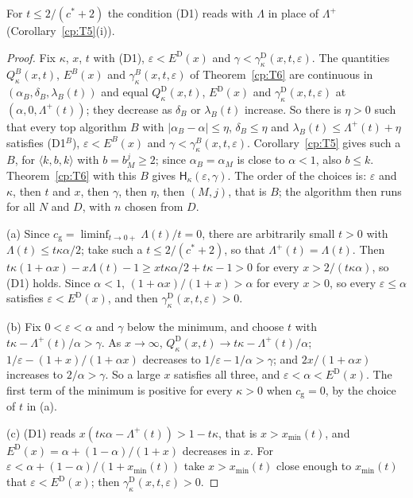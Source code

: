 \documentclass[11pt]{article}
\theoremstyle{definition}
\theoremstyle{remark}
\providecommand{\eps}{\varepsilon}
\newcommand{\abs}[1]{\lvert #1\rvert}
\newcommand{\mat}[3]{\langle #1,#2,#3\rangle} %
\newcommand{\Hypk}[1]{\mathsf{H}_{#1}}        %
\newcommand{\lamB}{\lambda_B}                 %
\newcommand{\delB}{\delta_B}                  %
\newcommand{\alB}{\alpha_B}                   %
\newcommand{\Lam}{\Lambda}                    %
\newcommand{\Lamp}{\Lambda^{+}}               %
\newcommand{\cg}{c_{\mathrm g}}               %
\newcommand{\cstar}{c^{*}}                    %
\newcommand{\Dcond}{\textup{(D1)}}            %
\newcommand{\Qgain}[2]{Q^{#1}_{#2}}           %
\newcommand{\Erange}[1]{E^{#1}}               %
\newcommand{\gbound}[2]{\gamma^{#1}_{#2}}     %
\newcommand{\xmin}{x_{\min}}                  %
\begin{document}
For $t\le2/(\cstar+2)$ the condition \Dcond{} reads with $\Lam$ in place of $\Lamp$ (Corollary~\ref{cp:T5}(i)).

\begin{proof}
Fix $\kappa$, $x$, $t$ with \Dcond, $\eps<\Erange{\mathrm D}(x)$ and $\gamma<\gbound{\mathrm D}\kappa(x,t,\eps)$. The quantities $\Qgain B\kappa(x,t)$, $\Erange B(x)$ and $\gbound B\kappa(x,t,\eps)$ of Theorem~\ref{cp:T6} are continuous in $(\alB,\delB,\lamB(t))$ and equal $\Qgain{\mathrm D}\kappa(x,t)$, $\Erange{\mathrm D}(x)$ and $\gbound{\mathrm D}\kappa(x,t,\eps)$ at $(\alpha,0,\Lamp(t))$; they decrease as $\delB$ or $\lamB(t)$ increase. So there is $\eta>0$ such that every top algorithm $B$ with $\abs{\alB-\alpha}\le\eta$, $\delB\le\eta$ and $\lamB(t)\le\Lamp(t)+\eta$ satisfies (D1$^B$), $\eps<\Erange B(x)$ and $\gamma<\gbound B\kappa(x,t,\eps)$. Corollary~\ref{cp:T5} gives such a $B$, for $\mat k{b}k$ with $b=b_M^j\ge2$; since $\alB=\alpha_M$ is close to $\alpha<1$, also $b\le k$. Theorem~\ref{cp:T6} with this $B$ gives $\Hypk\kappa(\eps,\gamma)$. The order of the choices is: $\eps$ and $\kappa$, then $t$ and $x$, then $\gamma$, then $\eta$, then $(M,j)$, that is $B$; the algorithm then runs for all $N$ and $D$, with $n$ chosen from $D$.

(a) Since $\cg=\liminf_{t\to0+}\Lam(t)/t=0$, there are arbitrarily small $t>0$ with $\Lam(t)\le t\kappa\alpha/2$; take such a $t\le2/(\cstar+2)$, so that $\Lamp(t)=\Lam(t)$. Then $t\kappa(1+\alpha x)-x\Lam(t)-1\ge xt\kappa\alpha/2+t\kappa-1>0$ for every $x>2/(t\kappa\alpha)$, so \Dcond{} holds. Since $\alpha<1$, $(1+\alpha x)/(1+x)>\alpha$ for every $x>0$, so every $\eps\le\alpha$ satisfies $\eps<\Erange{\mathrm D}(x)$, and then $\gbound{\mathrm D}\kappa(x,t,\eps)>0$.

(b) Fix $0<\eps<\alpha$ and $\gamma$ below the minimum, and choose $t$ with $t\kappa-\Lamp(t)/\alpha>\gamma$. As $x\to\infty$, $\Qgain{\mathrm D}\kappa(x,t)\to t\kappa-\Lamp(t)/\alpha$; $1/\eps-(1+x)/(1+\alpha x)$ decreases to $1/\eps-1/\alpha>\gamma$; and $2x/(1+\alpha x)$ increases to $2/\alpha>\gamma$. So a large $x$ satisfies all three, and $\eps<\alpha<\Erange{\mathrm D}(x)$. The first term of the minimum is positive for every $\kappa>0$ when $\cg=0$, by the choice of $t$ in (a).

(c) \Dcond{} reads $x(t\kappa\alpha-\Lamp(t))>1-t\kappa$, that is $x>\xmin(t)$, and $\Erange{\mathrm D}(x)=\alpha+(1-\alpha)/(1+x)$ decreases in $x$. For $\eps<\alpha+(1-\alpha)/(1+\xmin(t))$ take $x>\xmin(t)$ close enough to $\xmin(t)$ that $\eps<\Erange{\mathrm D}(x)$; then $\gbound{\mathrm D}\kappa(x,t,\eps)>0$.
\end{proof}
\end{document}
